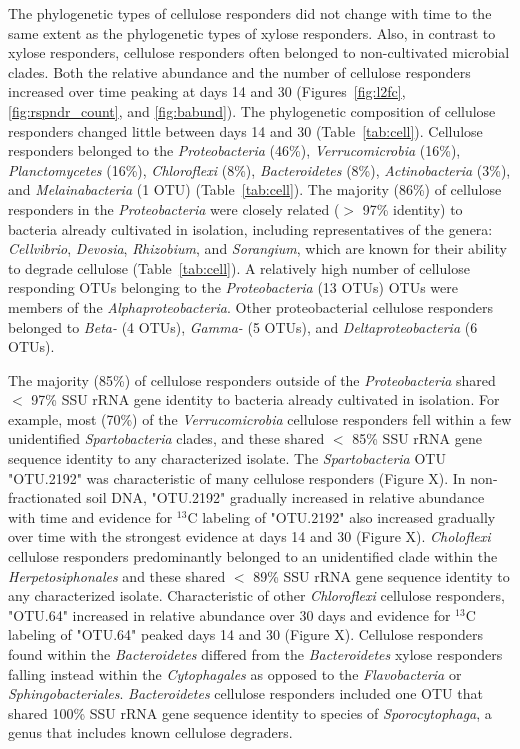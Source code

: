 The phylogenetic types of cellulose responders did not change with time to the
same extent as the phylogenetic types of xylose responders. Also, in contrast
to xylose responders, cellulose responders often belonged to non-cultivated
microbial clades. Both the relative abundance and the number of cellulose
responders increased over time peaking at days 14 and 30
(Figures~\ref{fig:l2fc}, \ref{fig:rspndr_count}, and \ref{fig:babund}). The
phylogenetic composition of cellulose responders changed little between days 14
and 30 (Table~\ref{tab:cell}). Cellulose responders belonged to the
\textit{Proteobacteria} (46\%), \textit{Verrucomicrobia} (16\%),
\textit{Planctomycetes} (16\%), \textit{Chloroflexi} (8\%),
\textit{Bacteroidetes} (8\%), \textit{Actinobacteria} (3\%), and
\textit{Melainabacteria} (1 OTU) (Table~\ref{tab:cell}). The majority (86\%) of
cellulose responders in the \textit{Proteobacteria} were closely related ($>$
97\% identity) to bacteria already cultivated in isolation, including
representatives of the genera: \textit{Cellvibrio}, \textit{Devosia},
\textit{Rhizobium}, and \textit{Sorangium}, which are known for their ability
to degrade cellulose (Table~\ref{tab:cell}). A relatively high number of
cellulose responding OTUs belonging to the \textit{Proteobacteria} (13 OTUs)
OTUs were members of the \textit{Alphaproteobacteria}. Other proteobacterial
cellulose responders belonged to \textit{Beta-} (4 OTUs), \textit{Gamma-} (5
OTUs), and \textit{Deltaproteobacteria} (6 OTUs). 

The majority (85\%) of cellulose responders outside of the
\textit{Proteobacteria} shared  $<$ 97\% SSU rRNA gene identity to bacteria
already cultivated in isolation. For example, most (70\%) of the
\textit{Verrucomicrobia} cellulose responders fell within a few unidentified
\textit{Spartobacteria} clades, and these shared $<$ 85\% SSU rRNA gene
sequence identity to any characterized isolate. The \textit{Spartobacteria} OTU
"OTU.2192" was characteristic of many cellulose responders (Figure X). In
non-fractionated soil DNA, "OTU.2192" gradually increased in relative abundance
with time and evidence for $^{13}$C labeling of "OTU.2192" also increased
gradually over time with the strongest evidence at days 14 and 30 (Figure X).
\textit{Choloflexi} cellulose responders predominantly belonged to an
unidentified clade within the \textit{Herpetosiphonales} and these shared $<$
89\% SSU rRNA gene sequence identity to any characterized isolate.
Characteristic of other \textit{Chloroflexi} cellulose responders, "OTU.64"
increased in relative abundance over 30 days and evidence for $^{13}$C labeling
of "OTU.64" peaked days 14 and 30 (Figure X). Cellulose responders found within
the \textit{Bacteroidetes} differed from the \textit{Bacteroidetes} xylose
responders falling instead within the \textit{Cytophagales} as opposed to the
\textit{Flavobacteria} or \textit{Sphingobacteriales}. \textit{Bacteroidetes}
cellulose responders included one OTU that shared 100\% SSU rRNA gene sequence
identity to species of \textit{Sporocytophaga}, a genus that includes known
cellulose degraders.

